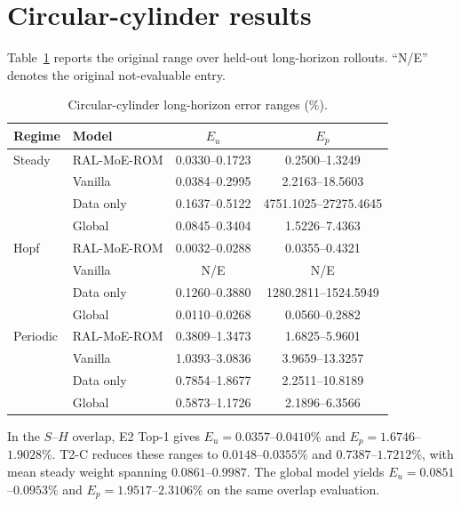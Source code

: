 \section{Circular-cylinder results}
\label{app:circular}

Table~\ref{tab:circular_full} reports the original range over held-out long-horizon rollouts. ``N/E'' denotes the original not-evaluable entry.

\begin{table}[h]
\centering
\caption{Circular-cylinder long-horizon error ranges (\%).}
\label{tab:circular_full}
\small
\setlength{\tabcolsep}{4pt}
\begin{tabular}{llcc}
\toprule
Regime & Model & $E_u$ & $E_p$ \\
\midrule
Steady & RAL-MoE-ROM & 0.0330--0.1723 & 0.2500--1.3249 \\
 & Vanilla & 0.0384--0.2995 & 2.2163--18.5603 \\
 & Data only & 0.1637--0.5122 & 4751.1025--27275.4645 \\
 & Global & 0.0845--0.3404 & 1.5226--7.4363 \\
\midrule
Hopf & RAL-MoE-ROM & 0.0032--0.0288 & 0.0355--0.4321 \\
 & Vanilla & N/E & N/E \\
 & Data only & 0.1260--0.3880 & 1280.2811--1524.5949 \\
 & Global & 0.0110--0.0268 & 0.0560--0.2882 \\
\midrule
Periodic & RAL-MoE-ROM & 0.3809--1.3473 & 1.6825--5.9601 \\
 & Vanilla & 1.0393--3.0836 & 3.9659--13.3257 \\
 & Data only & 0.7854--1.8677 & 2.2511--10.8189 \\
 & Global & 0.5873--1.1726 & 2.1896--6.3566 \\
\bottomrule
\end{tabular}
\end{table}

In the $S$--$H$ overlap, E2 Top-1 gives $E_u=0.0357$--$0.0410\%$ and $E_p=1.6746$--$1.9028\%$. T2-C reduces these ranges to $0.0148$--$0.0355\%$ and $0.7387$--$1.7212\%$, with mean steady weight spanning $0.0861$--$0.9987$. The global model yields $E_u=0.0851$--$0.0953\%$ and $E_p=1.9517$--$2.3106\%$ on the same overlap evaluation.
